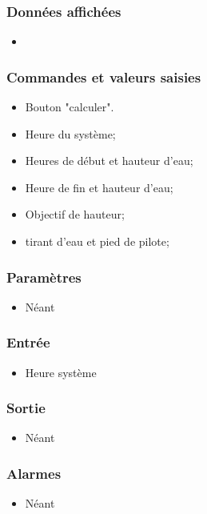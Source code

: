 \documentclass[a4paper,11pt]{report}
\begin{document}
\subsubsection{Données affichées}
\begin{itemize}
   \item 	
\end{itemize}

\subsubsection{Commandes et valeurs saisies}
\begin{itemize}
	\item Bouton "calculer".
	\item Heure du système;
    \item Heures de début et hauteur d'eau;
    \item Heure de fin et hauteur d'eau;
    \item Objectif de hauteur;
    \item tirant d'eau et pied de pilote;
\end{itemize}

\subsubsection{Paramètres}
\begin{itemize}
	\item Néant
\end{itemize}

\subsubsection{Entrée}
\begin{itemize}
	\item Heure système
\end{itemize}

\subsubsection{Sortie}
\begin{itemize}
	\item Néant
\end{itemize}

\subsubsection{Alarmes}
\begin{itemize}
	\item Néant
\end{itemize}
\end{document}
